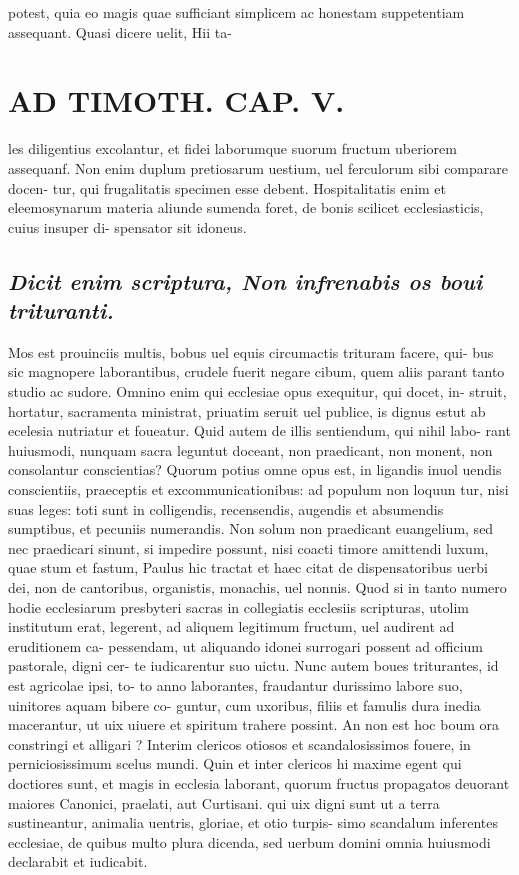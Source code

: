 \documentclass{article}
\begin{document}
\begin{pages}
potest, quia eo magis quae sufficiant simplicem ac honestam suppetentiam assequant. Quasi dicere uelit, Hii ta-  \pend
\section*{AD TIMOTH. CAP. V. }
\marginpar{[ p.523 ]}\pstart les diligentius excolantur, et fidei laborumque suorum fructum uberiorem assequanf. Non enim duplum pretiosarum uestium, uel ferculorum sibi comparare docen- tur, qui frugalitatis specimen esse debent. Hospitalitatis enim et eleemosynarum materia aliunde sumenda foret, de bonis scilicet ecclesiasticis, cuius insuper di- spensator sit idoneus.  \pend
{}
{}
\subsection*{\textit{Dicit enim scriptura, Non infrenabis os boui trituranti. }}\pstart Mos est prouinciis multis, bobus uel equis circumactis trituram facere, qui- bus sic magnopere laborantibus, crudele fuerit negare cibum, quem aliis parant tanto studio ac sudore. Omnino enim qui ecclesiae opus exequitur, qui docet, in- struit, hortatur, sacramenta ministrat, priuatim seruit uel publice, is dignus estut ab ecelesia nutriatur et foueatur. Quid autem de illis sentiendum, qui nihil labo- rant huiusmodi, nunquam sacra leguntut doceant, non praedicant, non monent, non consolantur conscientias? Quorum potius omne opus est, in ligandis inuol uendis conscientiis, praeceptis et excommunicationibus: ad populum non loquun tur, nisi suas leges: toti sunt in colligendis, recensendis, augendis et absumendis sumptibus, et pecuniis numerandis. Non solum non praedicant euangelium, sed nec praedicari sinunt, si impedire possunt, nisi coacti timore amittendi luxum, quae stum et fastum, Paulus hic tractat et haec citat de dispensatoribus uerbi dei, non de cantoribus, organistis, monachis, uel nonnis. Quod si in tanto numero hodie ecclesiarum presbyteri sacras in collegiatis ecclesiis scripturas, utolim institutum erat, legerent, ad aliquem legitimum fructum, uel audirent ad eruditionem ca- pessendam, ut aliquando idonei surrogari possent ad officium pastorale, digni cer- te iudicarentur suo uictu. Nunc autem boues triturantes, id est agricolae ipsi, to- to anno laborantes, fraudantur durissimo labore suo, uinitores aquam bibere co- guntur, cum uxoribus, filiis et famulis dura inedia macerantur, ut uix uiuere et spiritum trahere possint. An non est hoc boum ora constringi et alligari ? Interim clericos otiosos et scandalosissimos fouere, in perniciosissimum scelus mundi. Quin et inter clericos hi maxime egent qui doctiores sunt, et magis in ecclesia laborant, quorum fructus propagatos deuorant maiores Canonici, praelati, aut Curtisani. qui uix digni sunt ut a terra sustineantur, animalia uentris, gloriae, et otio turpis- simo scandalum inferentes ecclesiae, de quibus multo plura dicenda, sed uerbum domini omnia huiusmodi declarabit et iudicabit.  \pend
{}
{}

\end{pages}
\end{document}
